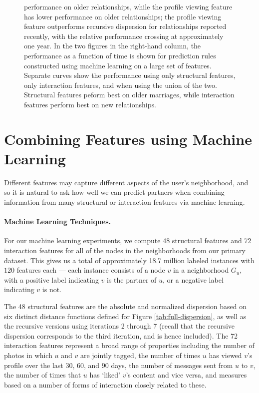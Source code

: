 \documentclass{sigchi}
\newcommand{\xhdr}[1]{\paragraph*{\bf #1.}}
\def\rs{\vspace*{-0.10in}}
\begin{document}
\begin{figure}[t]
{performance on older relationships, while the profile viewing feature 
has lower performance on older relationships;
the profile viewing feature outperforms recursive dispersion for
relationships reported recently, with the relative performance
crossing at approximately one year.
In the two figures in the right-hand column, 
the performance as a function of time is shown for prediction rules
constructed using machine learning on a large set of features.
Separate curves show the performance using only 
structural features, only interaction features, 
and when using the union of the
two.  Structural features peform best on older marriages, 
while interaction features perform best on new relationships.
\label{fig:age}
\rs
  }
\end{figure}

\section{Combining Features using Machine Learning}

Different features may capture different aspects of the user's
neighborhood, and so it is natural to ask how well we can predict partners when
combining information from many structural or interaction features 
via machine learning.

\xhdr{Machine Learning Techniques}
For our machine learning experiments, we compute $48$ structural features and
$72$ interaction features for all of the nodes in the neighborhoods
from our primary dataset.
This gives us a total of approximately 18.7 million labeled instances 
with $120$ features each ---
each instance consists of a node $v$ in a neighborhood $G_u$,
with a positive label indicating $v$ is the partner
of $u$, or a negative label indicating $v$ is not.


The 48 structural features are
the absolute and normalized dispersion
based on six distinct distance functions defined 
for Figure \ref{tab:full-dispersion},
as well as the recursive versions using iterations 2 through 7
(recall that the recursive dispersion 
corresponds to the third iteration, and is hence included).
The 72 interaction features represent a broad
range of properties including the number of photos in which $u$ and $v$ 
are jointly tagged, the number of times $u$ has viewed $v$'s profile
over the last 30, 60, and 90 days, the number of messages sent from $u$ to $v$,
the number of times that $u$ has `liked' $v$'s content and vice versa,
and measures based on a number of forms of interaction closely related 
to these.
\end{document}
